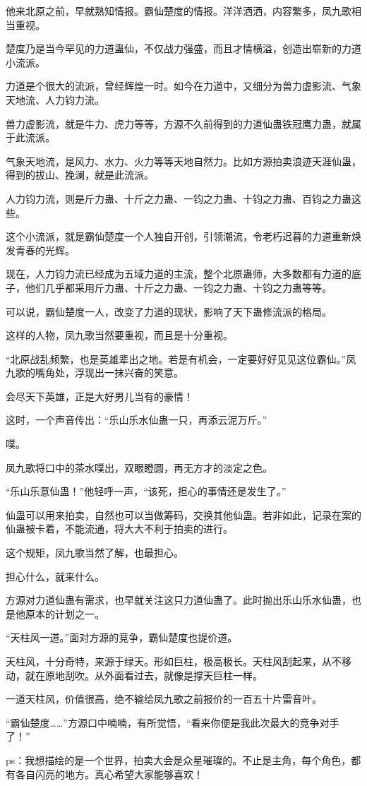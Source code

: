 \begin{this_body}
他来北原之前，早就熟知情报。霸仙楚度的情报。洋洋洒洒，内容繁多，凤九歌相当重视。

楚度乃是当今罕见的力道蛊仙，不仅战力强盛，而且才情横溢，创造出崭新的力道小流派。

力道是个很大的流派，曾经辉煌一时。如今在力道中，又细分为兽力虚影流、气象天地流、人力钧力流。

兽力虚影流，就是牛力、虎力等等，方源不久前得到的力道仙蛊铁冠鹰力蛊，就属于此流派。

气象天地流，是风力、水力、火力等等天地自然力。比如方源拍卖浪迹天涯仙蛊，得到的拔山、挽澜，就是此流派。

人力钧力流，则是斤力蛊、十斤之力蛊、一钧之力蛊、十钧之力蛊、百钧之力蛊这些。

这个小流派，就是霸仙楚度一个人独自开创，引领潮流，令老朽迟暮的力道重新焕发青春的光辉。

现在，人力钧力流已经成为五域力道的主流，整个北原蛊师，大多数都有力道的底子，他们几乎都采用斤力蛊、十斤之力蛊、一钧之力蛊、十钧之力蛊等等。

可以说，霸仙楚度一人，改变了力道的现状，影响了天下蛊修流派的格局。

这样的人物，凤九歌当然要重视，而且是十分重视。

“北原战乱频繁，也是英雄辈出之地。若是有机会，一定要好好见见这位霸仙。”凤九歌的嘴角处，浮现出一抹兴奋的笑意。

会尽天下英雄，正是大好男儿当有的豪情！

这时，一个声音传出：“乐山乐水仙蛊一只，再添云泥万斤。”

噗。

凤九歌将口中的茶水噗出，双眼瞪圆，再无方才的淡定之色。

“乐山乐意仙蛊！”他轻呼一声，“该死，担心的事情还是发生了。”

仙蛊可以用来拍卖，自然也可以当做筹码，交换其他仙蛊。若非如此，记录在案的仙蛊被卡着，不能流通，将大大不利于拍卖的进行。

这个规矩，凤九歌当然了解，也最担心。

担心什么，就来什么。

方源对力道仙蛊有需求，也早就关注这只力道仙蛊了。此时抛出乐山乐水仙蛊，也是他原本的计划之一。

“天柱风一道。”面对方源的竞争，霸仙楚度也提价道。

天柱风，十分奇特，来源于绿天。形如巨柱，极高极长。天柱风刮起来，从不移动，就在原地刮吹。从外面看过去，就像是撑天巨柱一样。

一道天柱风，价值很高，绝不输给凤九歌之前报价的一百五十片雷音叶。

“霸仙楚度……”方源口中喃喃，有所觉悟，“看来你便是我此次最大的竞争对手了！”

ps：我想描绘的是一个世界，拍卖大会是众星璀璨的。不止是主角，每个角色，都有各自闪亮的地方。真心希望大家能够喜欢！

\end{this_body}

